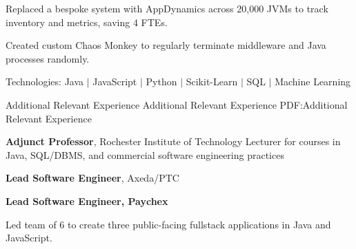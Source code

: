 \documentclass[MMMMyyyy,nonstopmode]{simpleresumecv_stacked}
\newcommand{\tech}[1]{\Gap\textrm{Technologies:} #1}
\newcommand{\comment}[1]{\ignorespaces} %
\newif\ifLOCATION
\newif\ifLONG
\newif\ifNOTSELECTED
\begin{document}
\begin{Body}
\begin{Detail}

\BulletItem
Replaced a bespoke system with AppDynamics across 20,000 JVMs to track inventory and metrics, saving 4 FTEs.

\BulletItem
Created custom Chaos Monkey to regularly terminate middleware and Java processes randomly. 

\tech{Java $|$ JavaScript $|$ Python $|$ Scikit-Learn $|$ \comment{TensorFlow $|$} SQL \comment{$|$ AppDynamics} $|$ Machine Learning}
\fi

\end{Detail}

\BigGap

\Section
{Additional Relevant Experience}
{Additional Relevant Experience}
{PDF:Additional Relevant Experience}

\Entry
\textbf{Adjunct Professor}, Rochester Institute of Technology
\Item 
Lecturer for courses in Java, SQL/DBMS, and commercial software engineering practices

\Entry
\textbf{Lead Software Engineer}, Axeda/PTC
\hfill 

\ifLOCATION
\hfill
Rochester, New York
\fi



\ifNOTSELECTED
\Entry
\textbf{Lead Software Engineer, Paychex}
\hfill

\begin{Detail}
Led team of 6 to create three public-facing fullstack applications in Java and JavaScript.
\end{Detail}

\ifLONG


\end{Body}
\end{document}
